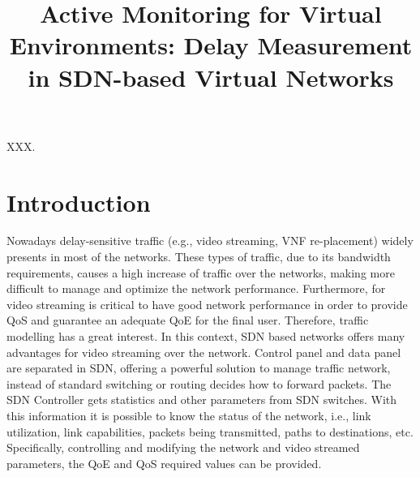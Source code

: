 \documentclass[10pt, journal, letterpaper]{IEEEtran}
\begin{document}
\title{Active Monitoring for Virtual Environments: Delay Measurement in SDN-based Virtual Networks}
\author{}
	\maketitle	
	\begin{abstract}
\end{abstract}	
	\begin{IEEEkeywords} 
	XXX.
	\end{IEEEkeywords}

\section{Introduction}
Nowadays delay-sensitive traffic (e.g., video streaming, VNF re-placement) widely presents in most of the networks. These types of traffic, due to its bandwidth requirements, causes a high increase of traffic over the networks, making more difficult to manage and optimize the network performance. Furthermore, for video streaming is critical to have good network performance in order to provide QoS and guarantee an adequate QoE for the final user. Therefore, traffic modelling has a great interest. In this context, SDN based networks offers many advantages for video streaming over the network. Control panel and data panel are separated in SDN, offering a powerful solution to manage traffic network, instead of standard switching or routing decides how to forward packets. The SDN Controller gets statistics and other parameters from SDN switches. With this information it is possible to know the status of the network, i.e., link utilization, link capabilities, packets being transmitted, paths to destinations, etc. Specifically, controlling and modifying the network and video streamed parameters, the QoE and QoS required values can be provided.
\end{document}
